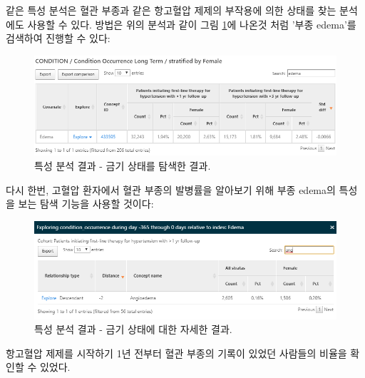 \documentclass[11pt]{book}
\theoremstyle{definition}
\theoremstyle{definition}
\theoremstyle{definition}
\theoremstyle{remark}
\begin{document}
같은 특성 분석은 혈관 부종과 같은 항고혈압 제제의 부작용에 의한 상태를
찾는 분석에도 사용할 수 있다. 방법은 위의 분석과 같이 그림
\ref{fig:atlasCharacterizationResultsContra}에 나온것 처럼 '부종
edema'를 검색하여 진행할 수 있다:

\begin{figure}

{\centering \includegraphics[width=1\linewidth]{images/Characterization/atlasCharacterizationResultsContra} 

}

\caption{특성 분석 결과 - 금기 상태를 탐색한 결과.}\label{fig:atlasCharacterizationResultsContra}
\end{figure}

다시 한번, 고혈압 환자에서 혈관 부종의 발병률을 알아보기 위해 부종
edema의 특성을 보는 탐색 기능을 사용할 것이다:

\begin{figure}

{\centering \includegraphics[width=1\linewidth]{images/Characterization/atlasCharacterizationResultsContraExplore} 

}

\caption{특성 분석 결과 - 금기 상태에 대한 자세한 결과.}\label{fig:atlasCharacterizationResultsContraExplore}
\end{figure}

항고혈압 제제를 시작하기 1년 전부터 혈관 부종의 기록이 있었던 사람들의
비율을 확인할 수 있었다.
\end{document}
